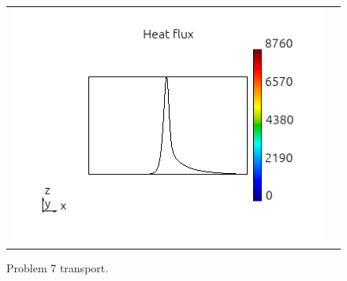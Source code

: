 \documentclass[review]{elsarticle}
\begin{document}
\begin{figure}[tbh]
\begin{center}
\begin{tabular}{cc}
      \includegraphics[width=\psize\textwidth]{figs/hflux_p71D5e7.png} 
    \end{tabular}
  \caption{
    Problem 7 transport.
  }
  \end{center}
  \label{fig:p7_Kn_hflux}
\end{figure}
\end{document}
